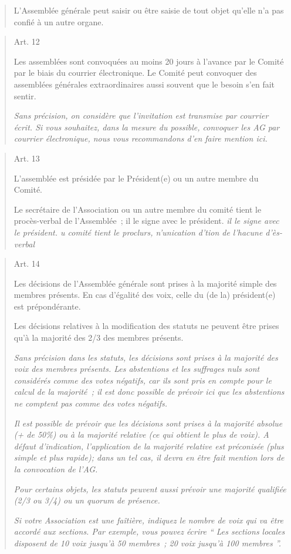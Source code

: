 \documentclass[10pt]{article}
\begin{document}
\begin{quote}
L'Assemblée générale peut saisir ou être saisie de tout objet qu'elle
n'a pas confié à un autre organe.

\end{quote}
\begin{quote}
Art. 12

Les assemblées sont convoquées au moins 20 jours à l'avance par le
Comité par le biais du courrier électronique. Le Comité peut convoquer 
des assemblées générales extraordinaires aussi souvent que le besoin 
s'en fait sentir.

\emph{Sans précision, on considère que l'invitation est transmise par
courrier écrit. Si vous souhaitez, dans la mesure du possible, convoquer
les AG par courrier électronique, nous vous recommandons d'en faire
mention ici.}

\end{quote}
\begin{quote}
Art. 13

L'assemblée est présidée par le Président(e) ou un autre membre du Comité.

Le secrétaire de l'Association ou un autre membre du comité tient le
procès-verbal de l'Assemblée~; il le signe avec le président. \emph{il
le signe avec le président. u comité tient le proclurs, n'unication
d'tion de l'hacune d'ès-verbal}

\end{quote}
\begin{quote}
Art. 14

Les décisions de l'Assemblée générale sont prises à la majorité simple
des membres présents. En cas d'égalité des voix, celle du (de la) président(e) est
prépondérante.

Les décisions relatives à la modification des statuts ne peuvent être
prises qu'à la majorité des 2/3 des membres présents.

\emph{Sans précision dans les statuts, les décisions sont prises à la
majorité des voix des membres présents. Les abstentions et les suffrages
nuls sont considérés comme des votes négatifs, car ils sont pris en
compte pour le calcul de la majorité~; il est donc possible de prévoir
ici que les abstentions ne comptent pas comme des votes négatifs.}

\emph{Il est possible de prévoir que les décisions sont prises à la
majorité absolue (+ de 50\%) ou à la majorité relative (ce qui obtient
le plus de voix). A défaut d'indication, l'application de la majorité
relative est préconisée (plus simple et plus rapide); dans un tel cas,
il devra en être fait mention lors de la convocation de l'AG.~}

\emph{Pour certains objets, les statuts peuvent aussi prévoir une
majorité qualifiée (2/3 ou 3/4) ou un quorum de présence.}

\emph{Si votre Association est une faîtière, indiquez le nombre de voix
qui va être accordé aux sections. Par exemple, vous pouvez écrire `` Les
sections locales disposent de 10 voix jusqu'à 50 membres~; 20 voix
jusqu'à 100 membres ''.}

\end{quote}
\end{document}
